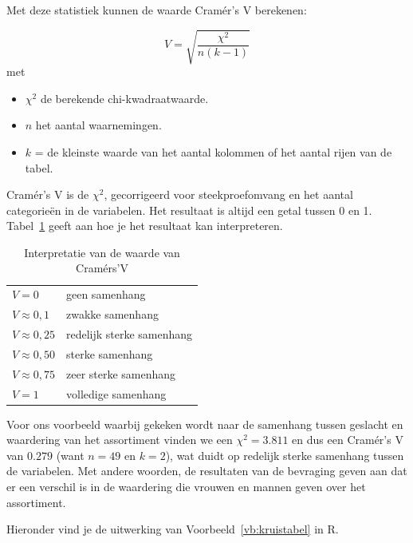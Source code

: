 Met deze statistiek kunnen de waarde Cramér's V berekenen:

\begin{definition}[Cramér's V]
  \begin{equation}
    V = \sqrt{\frac{\chi^{2}}{n(k-1)}}
    \label{eq:Craemer}
  \end{equation}
  met
  \begin{itemize}
    \item $\chi^{2}$ de berekende chi-kwadraatwaarde.
    \item $n$ het aantal waarnemingen.
    \item $k$ = de kleinste waarde van het aantal kolommen of het aantal rijen van de tabel.
  \end{itemize}

\end{definition}

Cramér's V is de $\chi^{2}$, gecorrigeerd voor steekproefomvang en het aantal categorieën in de variabelen. Het resultaat is altijd een getal tussen 0 en 1. Tabel~\ref{tab:interpretatie-cramers-v} geeft aan hoe je het resultaat kan interpreteren.

\begin{table}
  \centering
  \begin{tabular}{ll}
    $V = 0$ & geen samenhang \\
    $V \approx 0,1$ & zwakke samenhang \\
    $V \approx 0,25$ & redelijk sterke samenhang \\
    $V \approx 0,50$ & sterke samenhang \\
    $V \approx 0,75$ & zeer sterke samenhang \\
    $V = 1$ & volledige samenhang \\
  \end{tabular}
  \caption{Interpretatie van de waarde van Cramérs'V}
  \label{tab:interpretatie-cramers-v}
\end{table}

Voor ons voorbeeld waarbij gekeken wordt naar de samenhang tussen geslacht en waardering van het assortiment vinden we een $\chi^{2}= 3.811$ en dus een Cramér's V van $0.279$ (want $n = 49$ en $k = 2$), wat duidt op redelijk sterke samenhang tussen de variabelen. Met andere woorden, de resultaten van de bevraging geven aan dat er een verschil is in de waardering die vrouwen en mannen geven over het assortiment.

Hieronder vind je de uitwerking van Voorbeeld~\ref{vb:kruistabel} in R.

